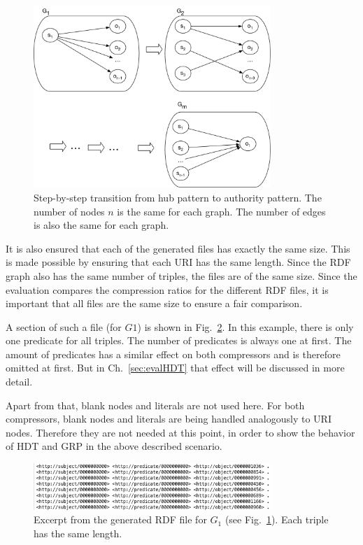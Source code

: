 \begin{figure}[h]
	\centering
	\includegraphics[width=0.8\textwidth]{figures/GRPvsHDT/starpattern.pdf}
	\caption{Step-by-step transition from hub pattern to authority pattern. The number of nodes $n$ is the same for each graph. The number of edges is also the same for each graph.}
	\label{fig:star_pattern}
\end{figure}

It is also ensured that each of the generated files has exactly the same size. This is made possible by ensuring that each URI has the same length. Since the RDF graph also has the same number of triples, the files are of the same size. Since the evaluation compares the compression ratios for the different RDF files, it is important that all files are the same size to ensure a fair comparison.

A section of such a file (for $G1$) is shown in Fig.~\ref{fig:rdfFile}. In this example, there is only one predicate for all triples. The number of predicates is always one at first. The amount of predicates has a similar effect on both compressors and is therefore omitted at first. But in Ch.~\ref{sec:evalHDT} that effect will be discussed in more detail.

Apart from that, blank nodes and literals are not used here. For both compressors, blank nodes and literals are being handled analogously to URI nodes. Therefore they are not needed at this point, in order to show the behavior of HDT and GRP in the above described scenario.

\begin{figure}[h]
	\centering
	\includegraphics[width=0.8\textwidth]{figures/GRPvsHDT/file.png}
	\caption{Excerpt from the generated RDF file for $G_1$ (see Fig.~\ref{fig:star_pattern}). Each triple has the same length.}
	\label{fig:rdfFile}
\end{figure}

